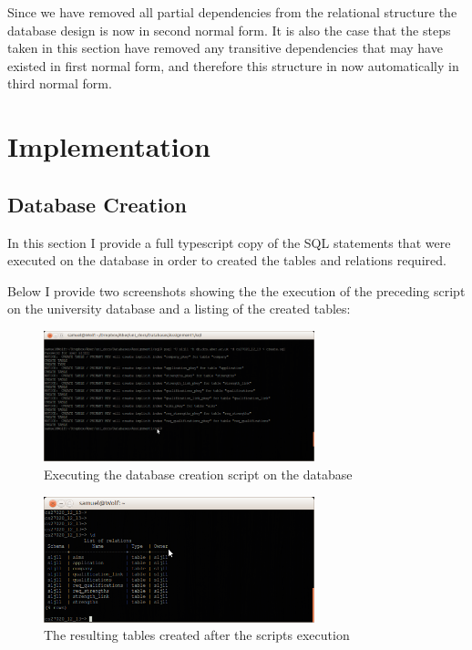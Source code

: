 \documentclass{article}
\begin{document}
Since we have removed all partial dependencies from the relational structure the database design is now in second normal form. It is also the case that the steps taken in this section have removed any transitive dependencies that may have existed in first normal form, and therefore this structure in now automatically in third normal form.

\section{Implementation}
\subsection{Database Creation}
In this section I provide a full typescript copy of the SQL statements that were executed on the database in order to created the tables and relations required.



Below I provide two screenshots showing the the execution of the preceding script on the university database and a listing of the created tables:

\begin{figure}[H]
\centering
\includegraphics[width=0.7\textwidth]{img/db-create.png}
\caption{Executing the database creation script on the database}
\label{fig:db-create}
\end{figure}

\begin{figure}[H]
\centering
\includegraphics[width=0.7\textwidth]{img/db-show-tables.png}
\caption{The resulting tables created after the scripts execution}
\label{fig:db-show-tables}
\end{figure}
\end{document}
